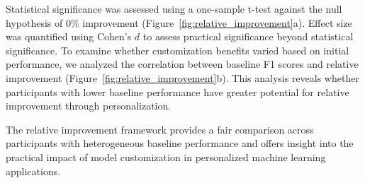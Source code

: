 \documentclass[11pt]{article}
\begin{document}
Statistical significance was assessed using a one-sample t-test against the null hypothesis of 0\% improvement (Figure~\ref{fig:relative_improvement}a). Effect size was quantified using Cohen's $d$ to assess practical significance beyond statistical significance. To examine whether customization benefits varied based on initial performance, we analyzed the correlation between baseline F1 scores and relative improvement (Figure~\ref{fig:relative_improvement}b). This analysis reveals whether participants with lower baseline performance have greater potential for relative improvement through personalization.

The relative improvement framework provides a fair comparison across participants with heterogeneous baseline performance and offers insight into the practical impact of model customization in personalized machine learning applications.
\end{document}
